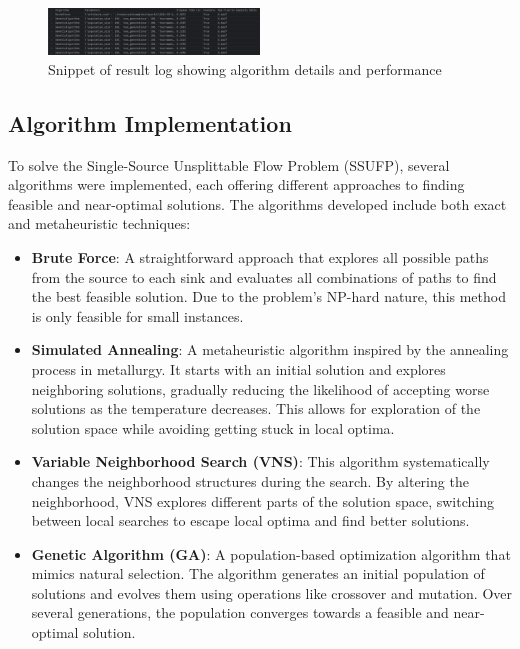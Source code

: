 \documentclass[a4paper,12pt]{article}
\begin{document}
\begin{figure}[H]
    \centering
    \includegraphics[width=0.5\textwidth]{report-snippet.png}
    \caption{Snippet of result log showing algorithm details and performance}
\end{figure}


\subsection{Algorithm Implementation}

To solve the Single-Source Unsplittable Flow Problem (SSUFP), several algorithms were implemented, each offering different approaches to finding feasible and near-optimal solutions. The algorithms developed include both exact and metaheuristic techniques:

\begin{itemize}
    \item \textbf{Brute Force}: A straightforward approach that explores all possible paths from the source to each sink and evaluates all combinations of paths to find the best feasible solution. Due to the problem's NP-hard nature, this method is only feasible for small instances.
    
    \item \textbf{Simulated Annealing}: A metaheuristic algorithm inspired by the annealing process in metallurgy. It starts with an initial solution and explores neighboring solutions, gradually reducing the likelihood of accepting worse solutions as the temperature decreases. This allows for exploration of the solution space while avoiding getting stuck in local optima.
    
    \item \textbf{Variable Neighborhood Search (VNS)}: This algorithm systematically changes the neighborhood structures during the search. By altering the neighborhood, VNS explores different parts of the solution space, switching between local searches to escape local optima and find better solutions.
    
    \item \textbf{Genetic Algorithm (GA)}: A population-based optimization algorithm that mimics natural selection. The algorithm generates an initial population of solutions and evolves them using operations like crossover and mutation. Over several generations, the population converges towards a feasible and near-optimal solution.
\end{itemize}
\end{document}
